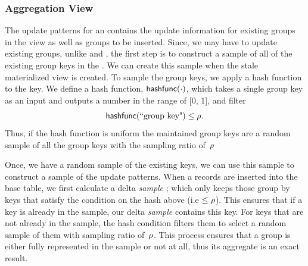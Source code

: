 
\subsubsection{Aggregation View}
The update patterns for an \aggview contains the update information for existing groups in the view as well as groups to be inserted. 
Since, we may have to update existing groups, unlike \spview and \fjview, the first step is to construct a sample of all of the existing group keys in the \aggview.
We can create this sample when the stale materialized view is created.
To sample the group keys, we apply a hash function to the key. We define a hash function, $\textsf{hashfunc}(\cdot)$, which takes a single group key as an input and outputs a number in the range of [0, 1], and filter
\begin{equation}\label{eq:hash}
\textsf{hashfunc}(\textrm{``group key"}) \leq \rho .
\end{equation}
Thus, if the hash function is uniform the maintained group keys are a random sample of all the group keys with the sampling ratio of~$\rho $

Once, we have a random sample of the existing keys, we can use this sample to construct a sample of the update patterns.
When a records are inserted into the base table, we first calculate a delta \emph{sample} \aggview; which only keeps those group by keys that satisfy the condition on the hash above (i.e $\le \rho $). This ensures that if a key is already in the sample, our delta \emph{sample} \aggview contains this key.
For keys that are not already in the sample, the hash condition filters them to select a random sample of them with sampling ratio of~$\rho $.
This process ensures that a group is either fully represented in the sample or not at all, thus its aggregate is an exact result.





